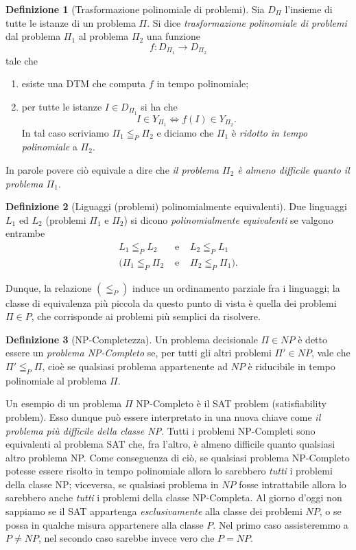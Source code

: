 \documentclass[10pt]{\classname}
\theoremstyle{newlinethm}
\theoremstyle{theorem}
\theoremstyle{definition}
\newtheorem{definizione}{Definizione}[section]
\theoremstyle{definition}
\theoremstyle{definition}
\theoremstyle{definition}
\begin{document}
\begin{definizione}[Trasformazione polinomiale di problemi]
    Sia $D_\Pi$ l'insieme di tutte le istanze di un problema $\Pi$. Si dice \emph{trasformazione polinomiale di problemi} dal problema $\Pi_1$ al problema $\Pi_2$ una funzione \[f : D_{\Pi_1} \rightarrow D_{\Pi_2}\] tale che
\begin{enumerate}
    \item esiste una DTM che computa $f$ in tempo polinomiale;
    \item per tutte le istanze $I \in D_{\Pi_1}$ si ha che \[I \in Y_{\Pi_1} \Leftrightarrow f(I) \in Y_{\Pi_2}.\] In tal caso scriviamo $\Pi_1 \leqq_P \Pi_2$ e diciamo che $\Pi_1$ è \emph{ridotto in tempo polinomiale} a $\Pi_2$.
\end{enumerate}

\end{definizione}

In parole povere ciò equivale a dire che \emph{il problema $\Pi_2$ è almeno difficile quanto il problema $\Pi_1$}.
\begin{definizione}[Liguaggi (problemi) polinomialmente equivalenti]
    Due linguaggi $L_1$ ed $L_2$ (problemi $\Pi_1$ e $\Pi_2$) si dicono \emph{polinomialmente equivalenti} se valgono entrambe
    \[
    \begin{array}{ccc}
        L_1 \leqq_P L_2 & \mbox{ e } & L_2 \leqq_P L_1 \\
        (\Pi_1 \leqq_P \Pi_2 & \mbox{ e } & \Pi_2 \leqq_P \Pi_1).
    \end{array}
\]
\end{definizione}
Dunque, la relazione $(\leqq_P)$ induce un ordinamento parziale fra i linguaggi; la classe di equivalenza più piccola da questo punto di vista è quella dei problemi $\Pi \in P$, che corrisponde ai problemi più semplici da risolvere.

\begin{definizione}[NP-Completezza]
    Un problema decisionale $\Pi \in NP$ è detto essere un \emph{problema NP-Completo} se, per tutti gli altri problemi $\Pi' \in NP$, vale che $\Pi' \leqq_P \Pi$, cioè se qualsiasi problema appartenente ad $NP$ è riducibile in tempo polinomiale al problema $\Pi$.
\end{definizione}
Un esempio di un problema $\Pi$ NP-Completo è il SAT problem (satisfiability problem). Esso dunque può essere interpretato in una nuova chiave come \emph{il problema più difficile della classe NP}. Tutti i problemi NP-Completi sono equivalenti al problema SAT che, fra l'altro, è almeno difficile quanto qualsiasi altro problema NP. Come conseguenza di ciò, se qualsiasi problema NP-Completo potesse essere risolto in tempo polinomiale allora lo sarebbero \emph{tutti} i problemi della classe NP; viceversa, se qualsiasi problema in $NP$ fosse intrattabile allora lo sarebbero anche \emph{tutti} i problemi della classe NP-Completa. Al giorno d'oggi non sappiamo se il SAT appartenga \emph{esclusivamente} alla classe dei problemi $NP$, o se possa in qualche misura appartenere alla classe $P$. Nel primo caso assisteremmo a $P \neq NP$, nel secondo caso sarebbe invece vero che $P = NP$.
\end{document}
